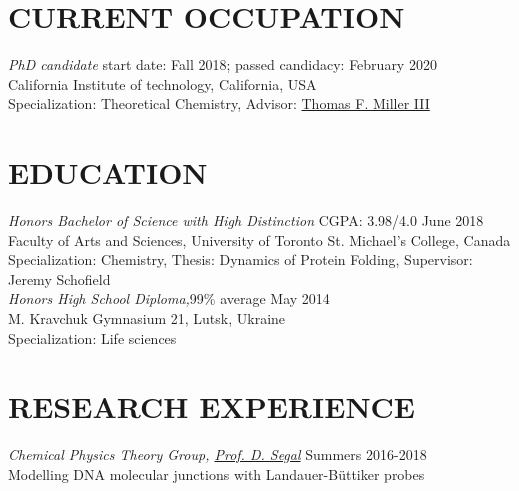 \documentclass[9pt, margin]{res}
\begin{document}
\begin{resume}

 
\section{CURRENT OCCUPATION}

{\sl PhD candidate} \hfill start date: Fall 2018; \qquad passed candidacy: February 2020\\
California Institute of technology, California, USA\\
Specialization: Theoretical Chemistry, Advisor: \href{https://millergroup.caltech.edu/Miller_Group/people/}{Thomas F. Miller III}\\

\section{EDUCATION}

{\sl Honors Bachelor of Science with High Distinction} \hfill CGPA: 3.98/4.0 \hfill June 2018 \\
Faculty of Arts and Sciences, University of Toronto St. Michael's College, Canada \\
Specialization: Chemistry, Thesis: Dynamics of Protein Folding, Supervisor: Jeremy Schofield\\

 
{\sl Honors High School Diploma,}\hfill 99\% average \hfill  May 2014\\
M. Kravchuk Gymnasium 21, Lutsk, Ukraine\\
Specialization: Life sciences\\
 
\section{RESEARCH EXPERIENCE}

{\sl Chemical Physics Theory Group, \href{http://www.chem.utoronto.ca/~dsegal/index.html}{Prof. D. Segal}} \hfill Summers 2016-2018 \\
Modelling DNA molecular junctions with Landauer-B\"uttiker probes


\end{resume}
\end{document}
